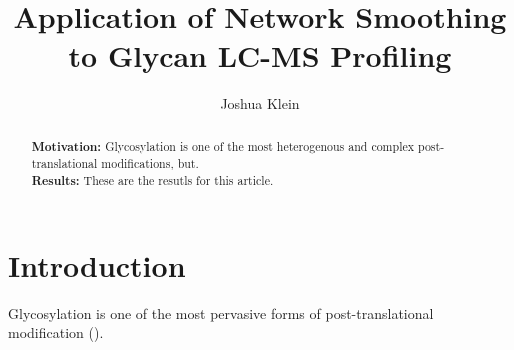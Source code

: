 \documentclass{article}
\begin{document}
\newcommand{\monosaccharide}[1]{{\bf #1}}
\newcommand{\nglycan}[0]{\textit{N}-glycan }
\newcommand{\nglycans}[0]{\textit{N}-glycans }

\newcommand{\msn}[0]{$MS^n$}

\newcommand{\agp}[0]{\textit{20150930-06-AGP}}
\newcommand{\phil}[0]{\textit{20141031-07-Phil-82}}
\newcommand{\philbs}[0]{\textit{20141101-04-Phil-BS}}
\newcommand{\igg}[0]{\textit{20151002-02-IGG}}
\newcommand{\dpphil}[0]{\textit{20141128-11-Phil-82}}
\newcommand{\dpagp}[0]{\textit{AGP-DR-Perm-glycans-1}}
\newcommand{\rpagp}[0]{\textit{AGP-permethylated-2ul-inj-55-SLens}}
\newcommand{\rphumanserum}[0]{\textit{Perm-BS-070111-04-Human-Serum}}
\newcommand{\rpserum}[0]{\textit{Perm-BS-070111-04-Human-Serum}}


\title{Application of Network Smoothing to Glycan LC-MS Profiling}
\author{Joshua Klein}
\begin{abstract}
    \textbf{Motivation:} Glycosylation is one of the most heterogenous
    and complex post-translational modifications, but.\\
    \textbf{Results:} These are the resutls for this article.\\
\end{abstract}

\maketitle

\section{Introduction}
Glycosylation is one of the most pervasive forms of post-translational
modification (\cite{Varki2017}).










\end{document}
